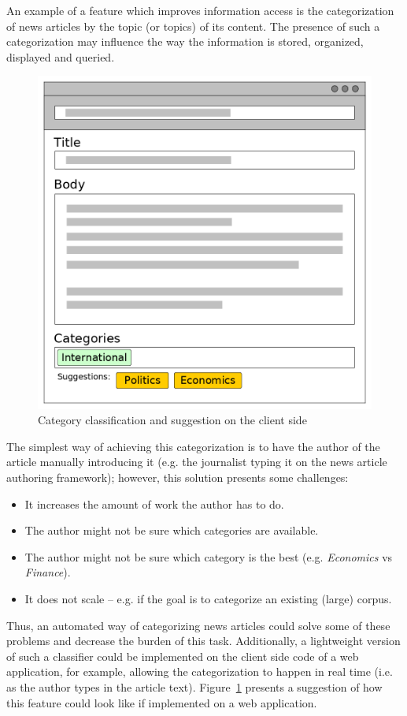 \documentclass[runningheads,a4paper]{llncs}[2015/06/24]
\begin{document}
An example of a feature which improves information access is the
categorization of news articles by the topic (or topics) of its
content\cite{kim2006extracting}. The presence of such a categorization
may influence the way the information is stored, organized, displayed
and queried\cite{teitler2008newsstand}.

\begin{figure}[H]
\centerline{\includegraphics[width=.67\columnwidth]{imgs/wireframe}}
\caption{Category classification and suggestion on the client side}
\label{fig:wireframe}
\end{figure}


The simplest way of achieving this categorization is to have the
author of the article manually introducing it (e.g. the journalist
typing it on the news article authoring framework); however, this
solution presents some challenges:
\begin{itemize}
    \item It increases the amount of work the author has to do.
    \item The author might not be sure which categories are available.
    \item The author might not be sure which category is the best
        (e.g. \emph{Economics} vs  \emph{Finance}).
    \item It does not scale -- e.g. if the goal is to categorize an
        existing (large) corpus.
\end{itemize}

Thus, an automated way of categorizing news articles could solve some
of these problems and decrease the burden of this task. Additionally,
a lightweight version of such a classifier could be implemented on the
client side code of a web application, for example, allowing the
categorization to happen in real time (i.e. as the author types in the
article text). Figure~\ref{fig:wireframe} presents a suggestion of
how this feature could look like if implemented on a web application.
\end{document}

